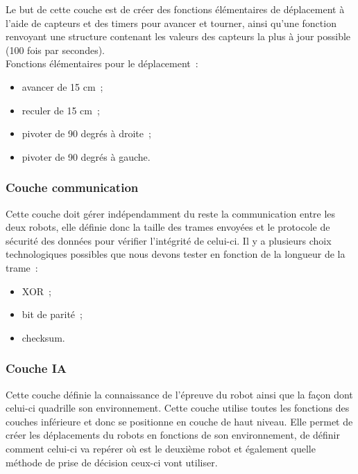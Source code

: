 \documentclass{article}
\begin{document}
Le but de cette couche est de créer des fonctions élémentaires de déplacement à l’aide de capteurs et des timers pour avancer et tourner, ainsi qu’une fonction renvoyant une structure contenant les valeurs des capteurs la plus à jour possible (100 fois par secondes). \\

Fonctions élémentaires pour le déplacement~: \\

\begin{itemize}
  \item avancer de 15 cm~;
  \item reculer de 15 cm~;
  \item pivoter de 90 degrés à droite~;
  \item pivoter de 90 degrés à gauche.
\end{itemize}

\subsubsection{Couche communication}

Cette couche doit gérer indépendamment du reste la communication entre les deux robots, elle définie donc la taille des trames envoyées et le protocole de sécurité des données pour vérifier l’intégrité de celui-ci. Il y a plusieurs choix technologiques possibles que nous devons tester en fonction de la longueur de la trame~: \\

\begin{itemize}
  \item XOR~;
  \item bit de parité~;
  \item checksum.
\end{itemize}

\subsubsection{Couche IA}

Cette couche définie la connaissance de l’épreuve du robot ainsi que la façon dont celui-ci quadrille son environnement. Cette couche utilise toutes les fonctions des couches inférieure et donc se positionne en couche de haut niveau. Elle permet de créer les déplacements du robots en fonctions de son environnement, de définir comment celui-ci va repérer où est le deuxième robot et également quelle méthode de prise de décision ceux-ci vont utiliser. \\
\end{document}
